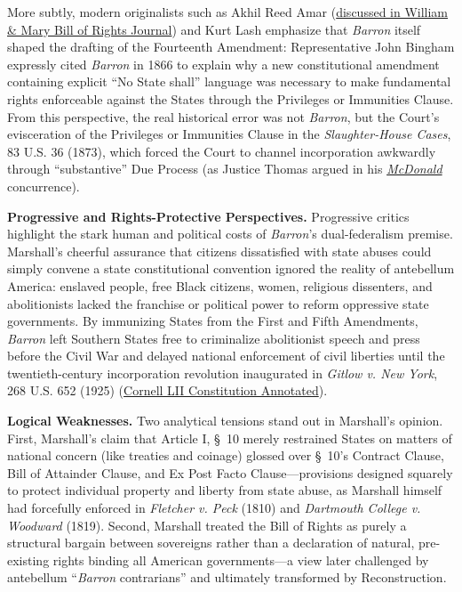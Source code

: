 \documentclass[12pt]{article}
\begin{document}
More subtly, modern originalists such as Akhil Reed Amar (\href{https://scholarship.law.wm.edu/cgi/viewcontent.cgi?article=1398&context=wmborj}{discussed in William \& Mary Bill of Rights Journal}) and Kurt Lash emphasize that \textit{Barron} itself shaped the drafting of the Fourteenth Amendment: Representative John Bingham expressly cited \textit{Barron} in 1866 to explain why a new constitutional amendment containing explicit ``No State shall'' language was necessary to make fundamental rights enforceable against the States through the Privileges or Immunities Clause. From this perspective, the real historical error was not \textit{Barron}, but the Court's evisceration of the Privileges or Immunities Clause in the \textit{Slaughter-House Cases}, 83 U.S. 36 (1873), which forced the Court to channel incorporation awkwardly through ``substantive'' Due Process (as Justice Thomas argued in his \href{https://supreme.justia.com/cases/federal/us/561/742/}{\textit{McDonald}} concurrence).

\textbf{Progressive and Rights-Protective Perspectives.} Progressive critics highlight the stark human and political costs of \textit{Barron}'s dual-federalism premise. Marshall's cheerful assurance that citizens dissatisfied with state abuses could simply convene a state constitutional convention ignored the reality of antebellum America: enslaved people, free Black citizens, women, religious dissenters, and abolitionists lacked the franchise or political power to reform oppressive state governments. By immunizing States from the First and Fifth Amendments, \textit{Barron} left Southern States free to criminalize abolitionist speech and press before the Civil War and delayed national enforcement of civil liberties until the twentieth-century incorporation revolution inaugurated in \textit{Gitlow v. New York}, 268 U.S. 652 (1925) (\href{https://www.law.cornell.edu/constitution-conan/amendment-14/overview-of-incorporation-of-the-bill-of-rights}{Cornell LII Constitution Annotated}).

\textbf{Logical Weaknesses.} Two analytical tensions stand out in Marshall's opinion. First, Marshall's claim that Article I, \S~10 merely restrained States on matters of national concern (like treaties and coinage) glossed over \S~10's Contract Clause, Bill of Attainder Clause, and Ex Post Facto Clause---provisions designed squarely to protect individual property and liberty from state abuse, as Marshall himself had forcefully enforced in \textit{Fletcher v. Peck} (1810) and \textit{Dartmouth College v. Woodward} (1819). Second, Marshall treated the Bill of Rights as purely a structural bargain between sovereigns rather than a declaration of natural, pre-existing rights binding all American governments---a view later challenged by antebellum ``\textit{Barron} contrarians'' and ultimately transformed by Reconstruction.
\end{document}
